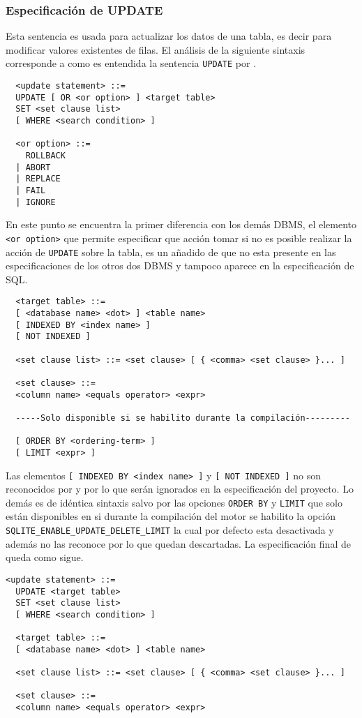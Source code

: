 \subsubsection{Especificación de UPDATE} 
\label{especificacion:dialectos:update}
Esta sentencia es usada para actualizar los datos de una tabla, es decir para modificar valores existentes de filas. El análisis de la siguiente sintaxis corresponde a como es entendida la sentencia \verb=UPDATE= por \s\cite{sqlite:sql}.
%
\begin{Verbatim}
  <update statement> ::=
  UPDATE [ OR <or option> ] <target table> 
  SET <set clause list>
  [ WHERE <search condition> ]
  
  <or option> ::=
    ROLLBACK
  | ABORT
  | REPLACE
  | FAIL
  | IGNORE
\end{Verbatim}
%
En este punto se encuentra la primer diferencia con los demás DBMS, el elemento \verb=<or option>= que permite especificar que acción tomar si no es posible realizar la acción de \verb=UPDATE= sobre la tabla, es un añadido de \s que no esta presente en las especificaciones de los otros dos DBMS y tampoco aparece en la especificación de SQL.
%
\begin{Verbatim}
  <target table> ::=
  [ <database name> <dot> ] <table name>
  [ INDEXED BY <index name> ]
  [ NOT INDEXED ]
  
  <set clause list> ::= <set clause> [ { <comma> <set clause> }... ]

  <set clause> ::=
  <column name> <equals operator> <expr>
  
  -----Solo disponible si se habilito durante la compilación---------
  
  [ ORDER BY <ordering-term> ]
  [ LIMIT <expr> ]

\end{Verbatim}
%
Las elementos \verb=[ INDEXED BY <index name> ]= y \verb=[ NOT INDEXED ]= no son reconocidos por \m y \p por lo que serán ignorados en la especificación del proyecto. Lo demás es de idéntica sintaxis salvo por las opciones \verb=ORDER BY= y \verb=LIMIT= que solo están disponibles en \s si durante la compilación del motor se habilito la opción \verb=SQLITE_ENABLE_UPDATE_DELETE_LIMIT= la cual por defecto esta desactivada y además \p no las reconoce por lo que quedan descartadas. La especificación final de \jj queda como sigue.
%
\begin{Verbatim}[frame=single, label=sintaxis para UPDATE]
  <update statement> ::=
  UPDATE <target table> 
  SET <set clause list>
  [ WHERE <search condition> ]
  
  <target table> ::=
  [ <database name> <dot> ] <table name>
  
  <set clause list> ::= <set clause> [ { <comma> <set clause> }... ]

  <set clause> ::=
  <column name> <equals operator> <expr>    
\end{Verbatim}
%
%
%
%
